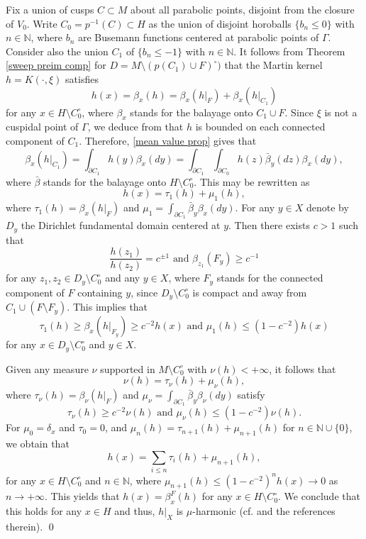 \documentclass[12pt,a4paper]{amsart}
\numberwithin{equation}{section}
\theoremstyle{definition}
\begin{document}
 Fix a union of cusps $C \subset M$ about all parabolic points, disjoint from the closure of $V_0$. 
Write $C_0 = p^{-1}(C) \subset H$ as the union of disjoint horoballs $\{ b_n \leq 0 \}$ with $n \in \mathbb{N}$, where $b_n$ are Busemann functions centered at parabolic points of $\Gamma$. Consider also the union $C_1$ of $\{b_n \leq -1\}$ with $n \in \mathbb{N}$. It follows from Theorem \ref{sweep preim comp} for $D = M \setminus (p(C_1) \cup F)^\circ)$ that the Martin kernel $h = K(\cdot , \xi)$ satisfies
\[
h(x) = \beta_x(h) = \beta_x(h|_F) + \beta_x(h|_{C_1})
\]
for any $x \in H \setminus C_0^\circ$, where $\beta_x$ stands for the balayage onto $C_1 \cup F$. Since $\xi$ is not a cuspidal point of $\Gamma$, we deduce from \cite[Theorem 3]{An} that $h$ is bounded on each connected component of $C_1$. Therefore,  \cref{mean value prop} gives that
\[
\beta_x(h|_{C_1}) = \int_{\partial C_1} h(y) \beta_x(dy) = \int_{\partial C_1} \int_{\partial C_0} h(z) \bar{\beta}_y(dz) \beta_x(dy),
\]
where $\bar{\beta}$ stands for the balayage onto $H \setminus C_0^\circ$. This may be rewritten as
\[
h(x) = \tau_1(h) + \mu_1(h),
\]
where $\tau_1(h) = \beta_x(h|_F)$ and $\mu_1 = \int_{\partial C_1} \bar{\beta}_y \beta_x(dy)$. For any $y \in X$ denote by $D_y$ the Dirichlet fundamental domain centered at $y$. Then there exists $c > 1$ such that
\[
\frac{h(z_1)}{h(z_2)} = c^{\pm 1} \text{ and } \beta_{z_1}(F_y) \geq c^{-1}
\]
for any $z_1, z_2 \in D_y \setminus C_0^\circ$ and any $y \in X$, where $F_y$ stands for the connected component of $F$ containing $y$, since $D_y \setminus C_0^\circ$ is compact and away from $C_1 \cup (F \setminus F_y)$. This implies that
\[
\tau_1(h) \geq \beta_x(h|_{F_y}) \geq c^{-2} h(x) \text{ and } \mu_1(h) \leq (1 - c^{-2}) h(x)
\]
for any $x \in D_y \setminus C_0^\circ$ and $y \in X$.

Given any measure $\nu$ supported in $M \setminus C_0^\circ$ with $\nu(h) < +\infty$, it follows that
\[
\nu(h) = \tau_{\nu}(h) + \mu_{\nu}(h),
\]
where $\tau_{\nu}(h) = \beta_{\nu}(h|_F)$ and $\mu_{\nu} = \int_{\partial C_1} \bar{\beta}_y \beta_{\nu}(dy)$ satisfy
\[
\tau_{\nu}(h) \geq c^{-2} \nu(h) \text{ and } \mu_{\nu}(h) \leq (1 - c^{-2}) \nu(h).
\]
For $\mu_0 = \delta_x$ and $\tau_0 = 0$, and $\mu_n(h) = \tau_{n+1}(h) + \mu_{n+1}(h)$ for $n \in \mathbb{N} \cup \{0\}$, we obtain that
\[
h(x) = \sum_{i \leq n} \tau_i(h) + \mu_{n+1}(h),
\]
for any $x \in H \setminus C_0^\circ$ and $n \in \mathbb{N}$, where $\mu_{n+1}(h) \leq (1-c^{-2})^{n} h(x) \rightarrow 0$ as $n \rightarrow + \infty$. This yields that $h(x) = \beta_x^F(h)$ for any $x \in H \setminus C_0^\circ$. We conclude that this holds for any $x \in H$ and thus, $h|_X$ is $\mu$-harmonic (cf. \cite[Theorem 1.10]{BL2} and the references therein). \qed
\end{document}
